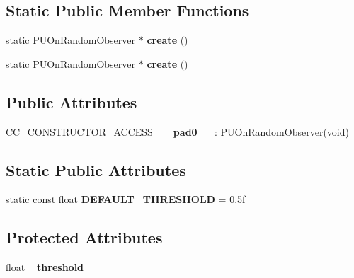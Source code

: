 \subsection*{Static Public Member Functions}
\begin{DoxyCompactItemize}
\item 
\mbox{\label{classPUOnRandomObserver_a25ca12990c30d53fc83c83fb52a392df}} 
static \hyperlink{classPUOnRandomObserver}{P\+U\+On\+Random\+Observer} $\ast$ {\bfseries create} ()
\item 
\mbox{\label{classPUOnRandomObserver_a7e1470ac801c299bb510c9f58d24932b}} 
static \hyperlink{classPUOnRandomObserver}{P\+U\+On\+Random\+Observer} $\ast$ {\bfseries create} ()
\end{DoxyCompactItemize}
\subsection*{Public Attributes}
\begin{DoxyCompactItemize}
\item 
\mbox{\label{classPUOnRandomObserver_a2401a27a7916ade410164bf525735b48}} 
\hyperlink{_2cocos2d_2cocos_2base_2ccConfig_8h_a25ef1314f97c35a2ed3d029b0ead6da0}{C\+C\+\_\+\+C\+O\+N\+S\+T\+R\+U\+C\+T\+O\+R\+\_\+\+A\+C\+C\+E\+SS} {\bfseries \+\_\+\+\_\+pad0\+\_\+\+\_\+}\+: \hyperlink{classPUOnRandomObserver}{P\+U\+On\+Random\+Observer}(void)
\end{DoxyCompactItemize}
\subsection*{Static Public Attributes}
\begin{DoxyCompactItemize}
\item 
\mbox{\label{classPUOnRandomObserver_ab9feb6eb21760bcfabf368eca89902af}} 
static const float {\bfseries D\+E\+F\+A\+U\+L\+T\+\_\+\+T\+H\+R\+E\+S\+H\+O\+LD} = 0.\+5f
\end{DoxyCompactItemize}
\subsection*{Protected Attributes}
\begin{DoxyCompactItemize}
\item 
\mbox{\label{classPUOnRandomObserver_a76e2a61734e7132fbaa6b634646fdb43}} 
float {\bfseries \+\_\+threshold}
\end{DoxyCompactItemize}
